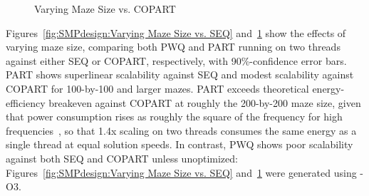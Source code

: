 \begin{figure}[tb]
\begin{center}
\end{center}
\caption{Varying Maze Size vs. COPART}
\label{fig:SMPdesign:Varying Maze Size vs. COPART}
\end{figure}

Figures~\ref{fig:SMPdesign:Varying Maze Size vs. SEQ}
and~\ref{fig:SMPdesign:Varying Maze Size vs. COPART}
show the effects of varying maze size, comparing both PWQ and PART
running on two threads
against either SEQ or COPART, respectively, with 90\%-confidence
error bars.
PART shows superlinear scalability against SEQ and modest scalability
against COPART for 100-by-100 and larger mazes.
PART exceeds theoretical energy-efficiency breakeven against COPART at roughly
the 200-by-200 maze size, given that power consumption rises as roughly
the square of the frequency for high frequencies~\cite{TrevorMudge2000Power},
so that 1.4x scaling on two threads consumes the same energy
as a single thread at equal solution speeds.
In contrast, PWQ shows poor scalability against both SEQ and COPART
unless unoptimized: Figures~\ref{fig:SMPdesign:Varying Maze Size vs. SEQ} 
and~\ref{fig:SMPdesign:Varying Maze Size vs. COPART}
were generated using -O3.

